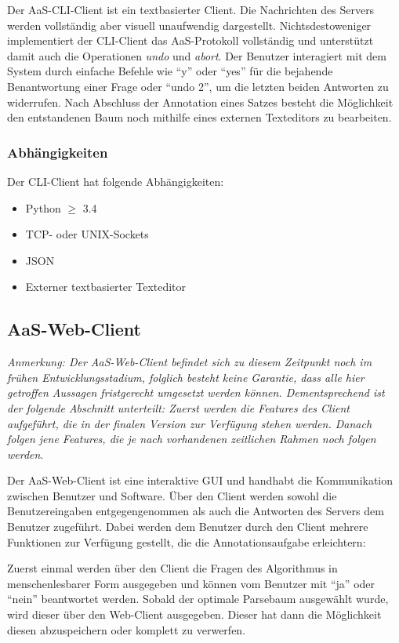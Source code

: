 \documentclass{scrartcl}
\begin{document}
Der AaS-CLI-Client ist ein textbasierter Client.
Die Nachrichten des Servers werden vollständig aber visuell unaufwendig dargestellt.
Nichtsdestoweniger implementiert der CLI-Client das AaS-Protokoll vollständig und unterstützt damit auch die Operationen \textit{undo} und \textit{abort}.
Der Benutzer interagiert mit dem System durch einfache Befehle wie \enquote{y} oder \enquote{yes} für die bejahende Benantwortung einer Frage oder \enquote{undo 2}, um die letzten beiden Antworten zu widerrufen.
Nach Abschluss der Annotation eines Satzes besteht die Möglichkeit den entstandenen Baum noch mithilfe eines externen Texteditors zu bearbeiten.

\subsubsection{Abhängigkeiten}
\label{ssub:CLI-Client-Abhaengigkeiten}

Der CLI-Client hat folgende Abhängigkeiten:
\begin{itemize}
    \item Python $\geq$ 3.4 
    \item TCP- oder UNIX-Sockets
    \item JSON
    \item Externer textbasierter Texteditor
\end{itemize}

\subsection{AaS-Web-Client}
\label{sub:AaS-Web-Client}
\textit{Anmerkung: Der AaS-Web-Client befindet sich zu diesem Zeitpunkt noch im frühen Entwicklungsstadium, folglich besteht keine Garantie, dass alle hier getroffen Aussagen fristgerecht umgesetzt werden können. Dementsprechend ist der folgende Abschnitt unterteilt: Zuerst werden die Features des Client aufgeführt, die in der finalen Version zur Verfügung stehen werden. Danach folgen jene Features, die je nach vorhandenen zeitlichen Rahmen noch folgen werden}.

Der AaS-Web-Client ist eine interaktive GUI und handhabt die Kommunikation zwischen Benutzer und Software.
Über den Client werden sowohl die Benutzereingaben entgegengenommen als auch die Antworten des Servers dem Benutzer zugeführt.
Dabei werden dem Benutzer durch den Client mehrere Funktionen zur Verfügung gestellt, die die Annotationsaufgabe erleichtern:

Zuerst einmal werden über den Client die Fragen des Algorithmus in menschenlesbarer Form ausgegeben und können vom Benutzer mit \enquote{ja} oder \enquote{nein} beantwortet werden.
Sobald der optimale Parsebaum ausgewählt wurde, wird dieser über den Web-Client ausgegeben.
Dieser hat dann die Möglichkeit diesen abzuspeichern oder komplett zu verwerfen.
\end{document}
